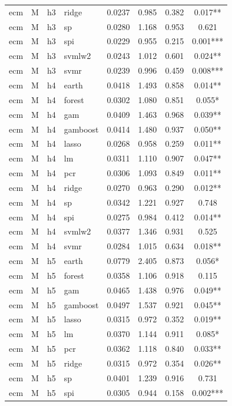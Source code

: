 \begin{ThreePartTable}
\begin{longtable}[t]{llclcccc}
ecm & M & h3 & ridge & 0.0237 & 0.985 & 0.382 & 0.017**\\
ecm & M & h3 & sp & 0.0280 & 1.168 & 0.953 & 0.621\\
ecm & M & h3 & spi & 0.0229 & 0.955 & 0.215 & 0.001***\\
ecm & M & h3 & svmlw2 & 0.0243 & 1.012 & 0.601 & 0.024**\\
ecm & M & h3 & svmr & 0.0239 & 0.996 & 0.459 & 0.008***\\
\addlinespace
ecm & M & h4 & earth & 0.0418 & 1.493 & 0.858 & 0.014**\\
ecm & M & h4 & forest & 0.0302 & 1.080 & 0.851 & 0.055*\\
ecm & M & h4 & gam & 0.0409 & 1.463 & 0.968 & 0.039**\\
ecm & M & h4 & gamboost & 0.0414 & 1.480 & 0.937 & 0.050**\\
ecm & M & h4 & lasso & 0.0268 & 0.958 & 0.259 & 0.011**\\
ecm & M & h4 & lm & 0.0311 & 1.110 & 0.907 & 0.047**\\
ecm & M & h4 & pcr & 0.0306 & 1.093 & 0.849 & 0.011**\\
ecm & M & h4 & ridge & 0.0270 & 0.963 & 0.290 & 0.012**\\
ecm & M & h4 & sp & 0.0342 & 1.221 & 0.927 & 0.748\\
ecm & M & h4 & spi & 0.0275 & 0.984 & 0.412 & 0.014**\\
ecm & M & h4 & svmlw2 & 0.0377 & 1.346 & 0.931 & 0.525\\
ecm & M & h4 & svmr & 0.0284 & 1.015 & 0.634 & 0.018**\\
\addlinespace
ecm & M & h5 & earth & 0.0779 & 2.405 & 0.873 & 0.056*\\
ecm & M & h5 & forest & 0.0358 & 1.106 & 0.918 & 0.115\\
ecm & M & h5 & gam & 0.0465 & 1.438 & 0.976 & 0.049**\\
ecm & M & h5 & gamboost & 0.0497 & 1.537 & 0.921 & 0.045**\\
ecm & M & h5 & lasso & 0.0315 & 0.972 & 0.352 & 0.019**\\
ecm & M & h5 & lm & 0.0370 & 1.144 & 0.911 & 0.085*\\
ecm & M & h5 & pcr & 0.0362 & 1.118 & 0.840 & 0.033**\\
ecm & M & h5 & ridge & 0.0315 & 0.972 & 0.354 & 0.026**\\
ecm & M & h5 & sp & 0.0401 & 1.239 & 0.916 & 0.731\\
ecm & M & h5 & spi & 0.0305 & 0.944 & 0.158 & 0.002***\\

\end{longtable}
\end{ThreePartTable}
